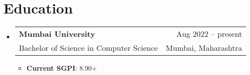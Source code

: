 \documentclass[letterpaper,10.5pt]{article}
\makeatletter
\newcommand{\resumeItem}[2]{
  \item\small{
    \textbf{#1}{: #2 \vspace{-2pt}}
  }
}
\newcommand{\resumeItemWithoutTitle}[1]{
  \item\small{
  {#1 \vspace{-2pt}}
    {\vspace{-2pt}}
  }
}
\newcommand{\resumeSubheading}[4]{
  \vspace{-1pt}\item
    \begin{tabular*}{0.97\textwidth}{l@{\extracolsep{\fill}}r}
      \textbf{#1} & #2 \\
      {#3} & {#4} \\
    \end{tabular*}\vspace{-5pt}
}
\newcommand{\resumeSubheadingProject}[5]{
  \vspace{0pt}\item
    \begin{tabular*}{0.97\textwidth}{l@{\extracolsep{\fill}}r}
   \href{#4}{\textbf{#1}} \small{{ $|$ #3}} { $|$ \textbf{#2}} & \href{#4}{\faIcon{link}} {\href{#5}{ \faIcon{code}} } \\
    \end{tabular*}\vspace{-7pt}
}
\newcommand{\resumeSubHeadingListStart}{\begin{itemize}[leftmargin=*, label={}]}
\newcommand{\resumeSubHeadingListEnd}{\end{itemize}}
\newcommand{\resumeItemListStart}{\begin{itemize}}
\newcommand{\resumeItemListEnd}{\end{itemize}\vspace{-5pt}}
\makeatother
\begin{document}

\section{Education}
\resumeSubHeadingListStart
    \resumeSubheading
      {Mumbai University}{Aug 2022 -- present}
      {Bachelor of Science in Computer Science}{Mumbai, Maharashtra}
      \resumeItemListStart
        \resumeItem{Current SGPI}{8.90+}
      \resumeItemListEnd
\resumeSubHeadingListEnd

 
\end{document}
